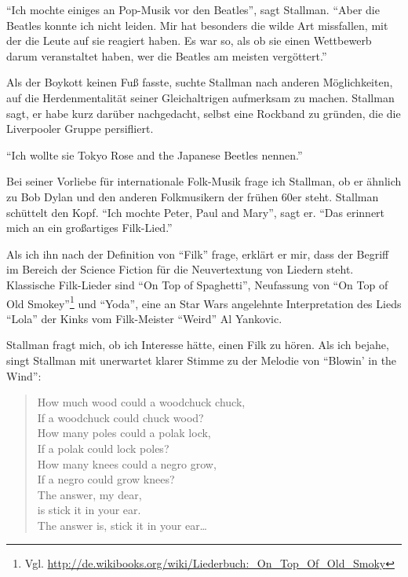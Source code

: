 "`Ich mochte einiges an Pop-Musik vor den Beatles"', sagt Stallman. "`Aber die Beatles konnte ich nicht leiden. Mir hat besonders die wilde Art missfallen, mit der die Leute auf sie reagiert haben. Es war so, als ob sie einen Wettbewerb darum veranstaltet haben, wer die Beatles am meisten vergöttert."'

Als der Boykott keinen Fuß fasste, suchte Stallman nach anderen Möglichkeiten, auf die Herdenmentalität seiner Gleichaltrigen aufmerksam zu machen. Stallman sagt, er habe kurz darüber nachgedacht, selbst eine Rockband zu gründen, die die Liverpooler Gruppe persifliert.

"`Ich wollte sie \glq Tokyo Rose and the Japanese Beetles\grq{} nennen."'

Bei seiner Vorliebe für internationale Folk-Musik frage ich Stallman, ob er ähnlich zu Bob Dylan und den anderen Folkmusikern der frühen 60er steht. Stallman schüttelt den Kopf. "`Ich mochte Peter, Paul and Mary"', sagt er. "`Das erinnert mich an ein großartiges Filk-Lied."'

Als ich ihn nach der Definition von "`Filk"' frage, erklärt er mir, dass der Begriff im Bereich der Science Fiction für die Neuvertextung von Liedern steht.  Klassische Filk-Lieder sind "`On Top of Spaghetti"', Neufassung von "`On Top of Old Smokey"'\footnote{Vgl. \url{http://de.wikibooks.org/wiki/Liederbuch:_On_Top_Of_Old_Smoky}} und "`Yoda"', eine an Star Wars angelehnte Interpretation des Lieds "`Lola"' der Kinks vom Filk-Meister "`Weird"' Al Yankovic.

Stallman fragt mich, ob ich Interesse hätte, einen Filk zu hören. Als ich bejahe, singt Stallman mit unerwartet klarer Stimme zu der Melodie von "`Blowin' in the Wind"':

\begin{verse}
How much wood could a woodchuck chuck,\\
If a woodchuck could chuck wood?\\
How many poles could a polak lock,\\
If a polak could lock poles?\\
How many knees could a negro grow,\\
If a negro could grow knees?\\
The answer, my dear,\\
is stick it in your ear.\\
The answer is, stick it in your ear\ldots
\end{verse}

